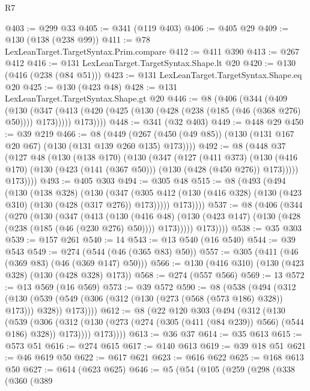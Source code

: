 \begin{lexlean}{R7}
\begin{coremodule}
@403 := @299 @33
@405 := @341 (@119 @403)
@406 := @405 @29
@409 := @130 (@138 (@238 @99))
@411 := @78 LexLeanTarget.TargetSyntax.Prim.compare
@412 := @411 @390
@413 := @267 @412
@416 := @131 LexLeanTarget.TargetSyntax.Shape.lt @20
@420 := @130 (@416 (@238 (@84 @51)))
@423 := @131 LexLeanTarget.TargetSyntax.Shape.eq @20
@425 := @130 (@423 @48)
@428 := @131 LexLeanTarget.TargetSyntax.Shape.gt @20
@446 := @8
    (@406
      (@344
        (@409
          (@130
            (@347 (@413 (@420 (@425 (@130 (@428 (@238 (@185 (@46 (@368 @276) @50)))) @173)))))
            @173))))
@448 := @341 (@32 @403)
@449 := @448 @29
@450 := @39 @219
@466 := @8
    (@449 (@267 (@450 (@49 @85)) (@130 (@131 @167 @20 @67) (@130 (@131 @139 @260 @135) @173))))
@492 := @8
    (@448
      @37
      (@127
        @48
        (@130
          (@138 @170)
          (@130
            (@347
              (@127
                (@411 @373)
                (@130 (@416 @170) (@130 (@423 (@141 (@367 @50))) (@130 (@428 (@450 @276)) @173)))))
            @173))))
@493 := @405 @303
@494 := @305 @48
@515 := @8
    (@493
      (@494
        (@130
          (@138 @328)
          (@130
            (@347 (@305 @412 (@130 (@416 @328) (@130 (@423 @310) (@130 (@428 (@317 @276)) @173)))))
            @173))))
@537 := @8
    (@406
      (@344
        (@270
          (@130
            (@347
              (@413
                (@130
                  (@416 @48)
                  (@130 (@423 @147) (@130 (@428 (@238 (@185 (@46 (@230 @276) @50)))) @173)))))
            @173))))
@538 := @35 @303
@539 := @157 @261
@540 := 14
@543 := @13 @540 (@16 @540)
@544 := @39 @543
@549 := @274 (@544 (@46 (@365 @83) @50))
@557 := @305 (@411 (@46 (@369 @83) (@46 (@369 @147) @50)))
@566 := @130 (@416 @310) (@130 (@423 @328) (@130 (@428 @328) @173))
@568 := @274 (@557 @566)
@569 := 13
@572 := @13 @569 (@16 @569)
@573 := @39 @572
@590 := @8
    (@538
      (@494
        (@312
          (@130 (@539 (@549 (@306 (@312 (@130 (@273 (@568 (@573 @186) @328)) @173))) @328)) @173))))
@612 := @8
    (@22
      @120
      @303
      (@494
        (@312
          (@130
            (@539
              (@306
                (@312 (@130 (@273 (@274 (@305 (@411 (@84 @239)) @566) (@544 @186) @328)) @173))))
            @173))))
@613 := @36 @37
@614 := @35 @613
@615 := @573 @51
@616 := @274 @615
@617 := @140 @613
@619 := @39 @18 @51
@621 := @46 @619 @50
@622 := @617 @621
@623 := @616 @622
@625 := @168 @613 @50
@627 := @614 (@623 @625)
@646 := @5
    (@54
      (@105
        (@259
          (@298
            (@338
              (@360
                (@389

\end{coremodule}
\end{lexlean}
